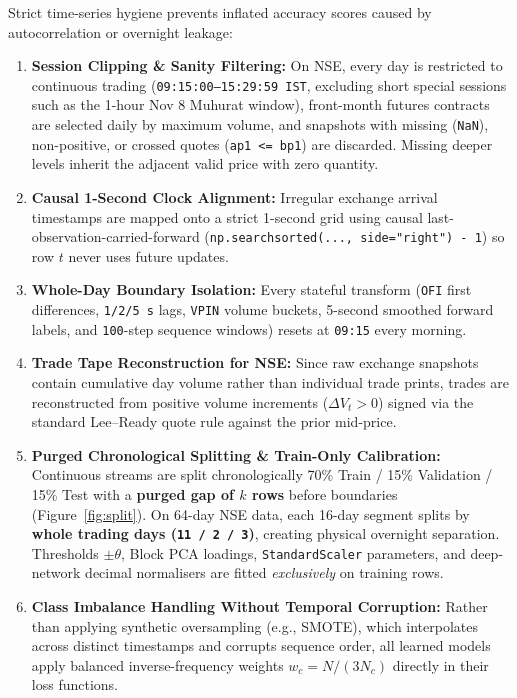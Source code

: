 \documentclass[12pt,a4paper,oneside]{report}
\newcommand{\code}[1]{\texttt{#1}}
\begin{document}
Strict time-series hygiene prevents inflated accuracy scores caused by autocorrelation or overnight leakage:
\begin{enumerate}
  \item \textbf{Session Clipping \& Sanity Filtering:} On NSE, every day is restricted to continuous trading (\code{09:15:00--15:29:59 IST}, excluding short special sessions such as the 1-hour Nov 8 Muhurat window), front-month futures contracts are selected daily by maximum volume, and snapshots with missing (\code{NaN}), non-positive, or crossed quotes (\code{ap1 <= bp1}) are discarded. Missing deeper levels inherit the adjacent valid price with zero quantity.
  \item \textbf{Causal 1-Second Clock Alignment:} Irregular exchange arrival timestamps are mapped onto a strict 1-second grid using causal last-observation-carried-forward (\code{np.searchsorted(..., side="right") - 1}) so row $t$ never uses future updates.
  \item \textbf{Whole-Day Boundary Isolation:} Every stateful transform (\code{OFI} first differences, \code{1/2/5 s} lags, \code{VPIN} volume buckets, 5-second smoothed forward labels, and \code{100}-step sequence windows) resets at \code{09:15} every morning.
  \item \textbf{Trade Tape Reconstruction for NSE:} Since raw exchange snapshots contain cumulative day volume rather than individual trade prints, trades are reconstructed from positive volume increments ($\Delta V_t > 0$) signed via the standard Lee--Ready quote rule against the prior mid-price.
  \item \textbf{Purged Chronological Splitting \& Train-Only Calibration:} Continuous streams are split chronologically 70\% Train / 15\% Validation / 15\% Test with a \textbf{purged gap of $k$ rows} before boundaries (Figure~\ref{fig:split}). On 64-day NSE data, each 16-day segment splits by \textbf{whole trading days (\code{11 / 2 / 3})}, creating physical overnight separation. Thresholds $\pm\theta$, Block PCA loadings, \code{StandardScaler} parameters, and deep-network decimal normalisers are fitted \emph{exclusively} on training rows.
  \item \textbf{Class Imbalance Handling Without Temporal Corruption:} Rather than applying synthetic oversampling (e.g., SMOTE), which interpolates across distinct timestamps and corrupts sequence order, all learned models apply balanced inverse-frequency weights $w_c = N / (3 N_c)$ directly in their loss functions.
\end{enumerate}
\end{document}
